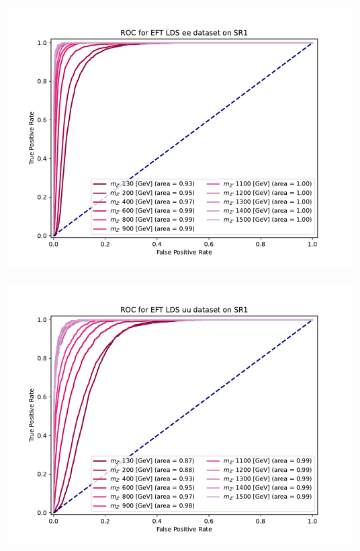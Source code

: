 \documentclass[12pt, a4paper]{book}
\begin{document}
\begin{figure}[!ht]
   \hfill
   \begin{subfigure}[b]{0.49\textwidth}
      \centering
      \includegraphics[width=1\textwidth]{XGBoost/Model_independent/50-100/EFT_LDS/ROC_ee.pdf}
   \end{subfigure}
   \hfill
   \begin{subfigure}[b]{0.49\textwidth}
      \centering
      \includegraphics[width=1\textwidth]{XGBoost/Model_independent/50-100/EFT_LDS/ROC_uu.pdf}
   \end{subfigure}
   \hfill
	\begin{subfigure}[b]{0.49\textwidth}
      \centering

\end{subfigure}
\end{figure}
\end{document}
